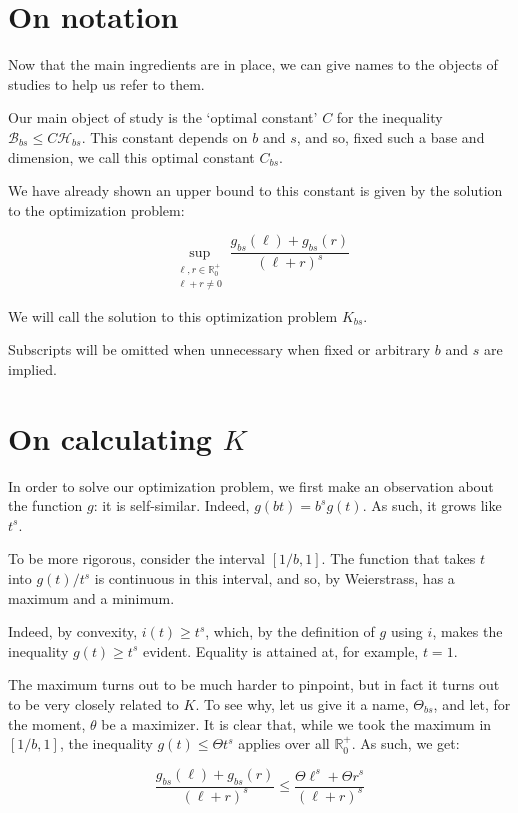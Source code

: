 \documentclass[11pt, reqno]{amsart}
\newcommand{\R}{\mathbb{R}}
\newcommand{\HH}{\mathcal{H}}
\newcommand{\BB}{\mathcal{B}}
\begin{document}
\section{On notation}

Now that the main ingredients are in place, we can give names to the objects of studies to help us refer to them.

Our main object of study is the `optimal constant' $C$ for the inequality $\BB_{bs} \leq C \HH_{bs}$. This constant depends on $b$ and $s$, and so, fixed such a base and dimension, we call this optimal constant $C_{bs}$.

We have already shown an upper bound to this constant is given by the solution to the optimization problem:

\[ \sup_{\substack{\ell,r \in \R^+_0\\\ell+r \neq 0}} \frac{g_{bs}(\ell) + g_{bs}(r)}{(\ell + r)^s} \]

We will call the solution to this optimization problem $K_{bs}$.

Subscripts will be omitted when unnecessary when fixed or arbitrary $b$ and $s$ are implied.

\section{On calculating $K$} \label{calck}

In order to solve our optimization problem, we first make an observation about the function $g$: it is self-similar. Indeed, $g(b t) = b^s g(t)$. As such, it grows like $t^s$.

To be more rigorous, consider the interval $\left[ 1/b, 1 \right]$. The function that takes $t$ into $g(t)/t^s$ is continuous in this interval, and so, by Weierstrass, has a maximum and a minimum.

Indeed, by convexity, $i(t) \geq t^s$, which, by the definition of $g$ using $i$, makes the inequality $g(t) \geq t^s$ evident. Equality is attained at, for example, $t = 1$.

The maximum turns out to be much harder to pinpoint, but in fact it turns out to be very closely related to $K$. To see why, let us give it a name, $\Theta_{bs}$, and let, for the moment, $\theta$ be a maximizer. It is clear that, while we took the maximum in $\left[ 1/b, 1 \right]$, the inequality $g(t) \leq \Theta t^s$ applies over all $\R^+_0$. As such, we get:

\[\frac{g_{bs}(\ell) + g_{bs}(r)}{(\ell + r)^s} \leq \frac{\Theta \ell^s + \Theta r^s}{(\ell+r)^s}\]
\end{document}
